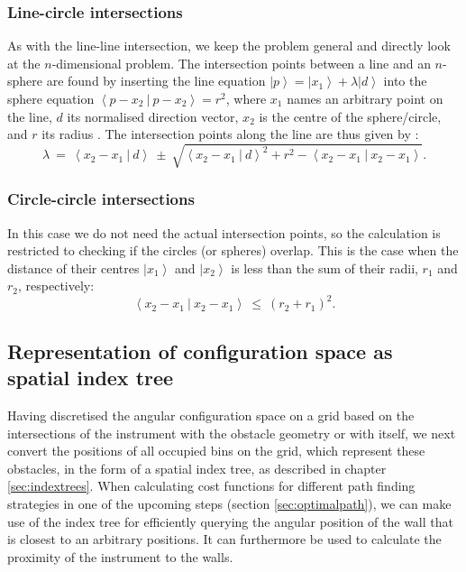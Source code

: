 \subsubsection*{Line-circle intersections}
As with the line-line intersection, we keep the problem general and directly look at the $n$-dimensional problem.
The intersection points between a line and an $n$-sphere are found by inserting the line equation 
$\left|p\right> = \left|x_1\right> + \lambda \left|d\right>$ into the sphere equation 
$\left< p-x_2 \ |\  p-x_2 \right> = r^2$, where $x_1$ names an arbitrary point on the line, $d$ its normalised 
direction vector, $x_2$ is the centre of the sphere/circle, and $r$ its radius \cite{wiki_line_sphere_intersection}.
The intersection points along the line are thus given by \cite{wiki_line_sphere_intersection}:
\begin{equation}
	\lambda \ =\ \left< x_2 - x_1 \  |\  d \right>
		\ \pm\ \sqrt{ \left< x_2 - x_1 \  |\  d \right>^2 
			+ r^2 - \left< x_2 - x_1 \ |\  x_2 - x_1 \right>}.
\end{equation}



\subsubsection*{Circle-circle intersections}
In this case we do not need the actual intersection points, so the calculation is restricted to checking if
the circles (or spheres) overlap. This is the case when the distance of their centres 
$\left| x_1 \right>$ and $\left| x_2 \right>$ is less than the sum of their radii, $r_1$ and $r_2$, respectively:
\begin{equation}
	\left< x_2 - x_1 \ |\ x_2 - x_1  \right> \ \leq \ \left( r_2 + r_1 \right)^2.
\end{equation}




\subsection{Representation of configuration space as spatial index tree}
\label{sec:walls_index_tree}
Having discretised the angular configuration space on a grid based on the intersections of the instrument
with the obstacle geometry or with itself, we next convert the positions
of all occupied bins on the grid, which represent these obstacles, in the form of a spatial index tree,
as described in chapter \ref{sec:indextrees}.
When calculating cost functions for different path finding strategies in one of the upcoming steps 
(section \ref{sec:optimalpath}), we can make use of the index tree for efficiently querying
the angular position of the wall that is closest to an arbitrary positions. 
It can furthermore be used to calculate the proximity of the instrument to the walls.

